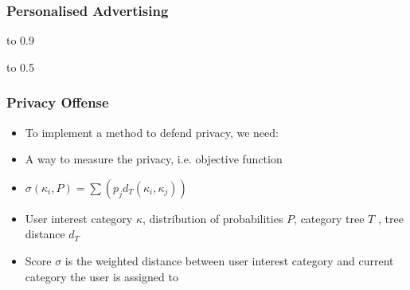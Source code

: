 \documentclass{beamer}
\begin{document}
\begin{frame}
\frametitle{Personalised Advertising}
\begin{minipage}{0.4\textwidth}
	\vbox to 0.9
\end{minipage}\hfill
\begin{minipage}{0.6\textwidth}
	\vbox to 0.5
\end{minipage}
\end{frame}


\begin{frame}
	\frametitle{Privacy Offense}
	\begin{itemize} %
		\item To implement a method to defend privacy, we need:
		\item A way to measure the privacy, i.e. objective function
		\item $\sigma(\kappa_{i},P)=\sum(p_{j}d_T(\kappa_{i},\kappa_{j}))$
		\item User interest category $\kappa$, distribution of probabilities $P$, category tree $T$ , tree distance $d_{T}$
		\item Score $\sigma$ is the weighted distance between user interest category and current
		category the user is assigned to
	\end{itemize}
\end{frame}
\end{document}
